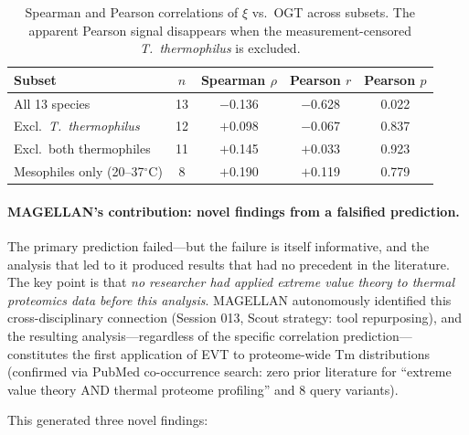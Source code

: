 \begin{table}[htbp]
\centering
\caption{Spearman and Pearson correlations of $\xi$ vs.\ OGT across subsets. The apparent Pearson signal disappears when the measurement-censored \textit{T.\ thermophilus} is excluded.}
\label{tab:gev_correlation}
\small
\begin{tabular}{@{}lcccc@{}}
\toprule
\textbf{Subset} & $n$ & \textbf{Spearman $\rho$} & \textbf{Pearson $r$} & \textbf{Pearson $p$} \\
\midrule
All 13 species & 13 & $-$0.136 & $-$0.628 & 0.022 \\
Excl.\ \textit{T.\ thermophilus} & 12 & $+$0.098 & $-$0.067 & 0.837 \\
Excl.\ both thermophiles & 11 & $+$0.145 & $+$0.033 & 0.923 \\
Mesophiles only (20--37$^\circ$C) & 8 & $+$0.190 & $+$0.119 & 0.779 \\
\bottomrule
\end{tabular}
\end{table}

\paragraph{MAGELLAN's contribution: novel findings from a falsified prediction.} The primary prediction failed---but the failure is itself informative, and the analysis that led to it produced results that had no precedent in the literature. The key point is that \emph{no researcher had applied extreme value theory to thermal proteomics data before this analysis}. MAGELLAN autonomously identified this cross-disciplinary connection (Session 013, Scout strategy: tool repurposing), and the resulting analysis---regardless of the specific correlation prediction---constitutes the first application of EVT to proteome-wide Tm distributions (confirmed via PubMed co-occurrence search: zero prior literature for ``extreme value theory AND thermal proteome profiling'' and 8 query variants).

This generated three novel findings:

